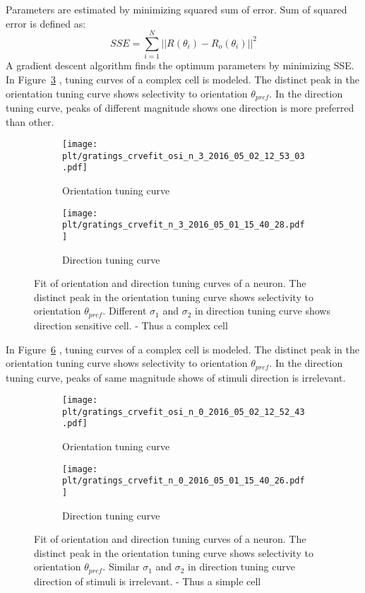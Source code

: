 \documentclass[MTech]{iitmdiss}
\newcommand{\plt}{thesis_plots}
\begin{document}
Parameters are estimated by minimizing squared sum of error. Sum of squared error is defined as:
$$SSE = \sum_{i=1}^N ||R(\theta_i) - R_o(\theta_i)||^2$$
A gradient descent algorithm finds the optimum parameters by minimizing SSE.
In Figure~\ref{fig:curvefit_complex} , tuning curves of a complex cell is modeled. The distinct peak in the orientation tuning curve shows selectivity to orientation $\theta_{pref}$. In the direction tuning curve, peaks of different magnitude shows one direction is more preferred than other.
\begin{figure}[h]
  \begin{subfigure}[b]{0.5\textwidth}
    \texttt{[image: \\plt/gratings\_crvefit\_osi\_n\_3\_2016\_05\_02\_12\_53\_03.pdf]}
    \caption{Orientation tuning curve}
    \label{fig:oritune_complex}
  \end{subfigure}%
  \begin{subfigure}[b]{0.5\textwidth}
    \texttt{[image: \\plt/gratings\_crvefit\_n\_3\_2016\_05\_01\_15\_40\_28.pdf]}
    \caption{Direction tuning curve}
    \label{fig:dirtune_complex}
  \end{subfigure}%
  \caption{Fit of orientation and direction tuning curves of a neuron. The distinct peak in the orientation tuning curve shows selectivity to orientation $\theta_{pref}$. Different $\sigma_1$ and $\sigma_2$ in direction tuning curve shows direction sensitive cell. - Thus a complex cell}\label{fig:curvefit_complex}
\end{figure}
In Figure~\ref{fig:curvefit_simple} , tuning curves of a complex cell is modeled. The distinct peak in the orientation tuning curve shows selectivity to orientation $\theta_{pref}$. In the direction tuning curve, peaks of same magnitude shows of stimuli direction is irrelevant.
\begin{figure}[h]
  \begin{subfigure}[b]{0.5\textwidth}
    \texttt{[image: \\plt/gratings\_crvefit\_osi\_n\_0\_2016\_05\_02\_12\_52\_43.pdf]}
    \caption{Orientation tuning curve}
    \label{fig:oritune_simple}
  \end{subfigure}%
  \begin{subfigure}[b]{0.5\textwidth}
    \texttt{[image: \\plt/gratings\_crvefit\_n\_0\_2016\_05\_01\_15\_40\_26.pdf]}
    \caption{Direction tuning curve}
    \label{fig:dirtune_simple}
  \end{subfigure}%
  \caption{Fit of orientation and direction tuning curves of a neuron. The distinct peak in the orientation tuning curve shows selectivity to orientation $\theta_{pref}$. Similar $\sigma_1$ and $\sigma_2$ in direction tuning curve direction of stimuli is irrelevant. - Thus a simple cell}\label{fig:curvefit_simple}
\end{figure}
\end{document}
